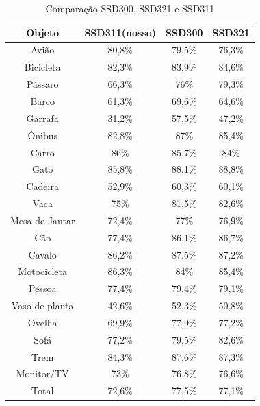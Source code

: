   \begin{table}[H]
    \centering
    \footnotesize
    \setlength{\abovecaptionskip}{0pt}
    \setlength{\belowcaptionskip}{0pt}
    \caption[Resultados SSD]{Comparação SSD300, SSD321 e SSD311}
    \label{tab:resultados}
    \begin{tabular}{c|c|c|c}
	Objeto &	SSD311(nosso) & SSD300 & SSD321 \\ 
	\hline 
 	Avião 			& 80,8\%	& 79,5\% 	& 76,3\% \\ 
	Bicicleta 		& 82,3\%	& 83,9\% 	& 84,6\%  \\ 
	Pássaro 		& 66,3\%	& 76\%  	& 79,3\%  \\
	Barco 			& 61,3\%	& 69,6\% 	& 64,6\%  \\ 
	Garrafa 		& 31,2\%	& 57,5\%  	& 47,2\%  \\ 
	Ônibus 			& 82,8\%	& 87\%	 	& 85,4\%  \\
	Carro 			& 86\%		& 85,7\%  	& 84\%  \\ 
	Gato 			& 85,8\%	& 88,1\%  	& 88,8\%  \\
	Cadeira 		& 52,9\%	& 60,3\%  	& 60,1\%  \\ 
	Vaca 			& 75\% 		& 81,5\% 	& 82,6\%  \\
	Mesa de Jantar 	& 72,4\% 	& 77\%  	& 76,9\%  \\ 
	Cão 			& 77,4\% 	& 86,1\% 	& 86,7\%  \\
	Cavalo 			& 86,2\% 	& 87,5\% 	& 87,2\%  \\ 
	Motocicleta 	& 86,3\% 	& 84\%  	& 85,4\%  \\
	Pessoa 			& 77,4\% 	& 79,4\%  	& 79,1\%  \\ 
	Vaso de planta 	& 42,6\% 	& 52,3\%  	& 50,8\%  \\
	Ovelha 			& 69,9\%	& 77,9\%  	& 77,2\%  \\
	Sofá 			& 77,2\% 	& 79,5\%  	& 82,6\%  \\
	Trem 			& 84,3\% 	& 87,6\%  	& 87,3\%  \\
	Monitor/TV 		& 73\% 		& 76,8\%  	& 76,6\%  \\ 
	Total 			& 72,6\% 	& 77,5\%  	& 77,1\%  \\
    \end{tabular}
    \\
  \end{table}



